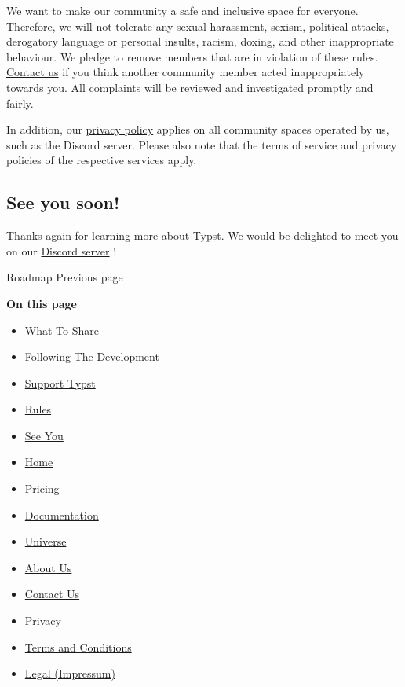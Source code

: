 We want to make our community a safe and inclusive space for everyone.
Therefore, we will not tolerate any sexual harassment, sexism, political
attacks, derogatory language or personal insults, racism, doxing, and
other inappropriate behaviour. We pledge to remove members that are in
violation of these rules. \href{https://typst.app/contact/}{Contact us}
if you think another community member acted inappropriately towards you.
All complaints will be reviewed and investigated promptly and fairly.

In addition, our \href{https://typst.app/privacy/}{privacy policy}
applies on all community spaces operated by us, such as the Discord
server. Please also note that the terms of service and privacy policies
of the respective services apply.

\subsection{See you soon!}\label{see-you}

Thanks again for learning more about Typst. We would be delighted to
meet you on our \href{https://discord.gg/2uDybryKPe}{Discord server} !

\href{/docs/roadmap/}{\pandocbounded{}}

{ Roadmap } { Previous page }

\textbf{On this page}

\begin{itemize}
\tightlist
\item
  \hyperref[what-to-share]{What To Share}
\item
  \hyperref[following-the-development]{Following The Development}
\item
  \hyperref[support-typst]{Support Typst}
\item
  \hyperref[rules]{Rules}
\item
  \hyperref[see-you]{See You}
\end{itemize}

\begin{itemize}
\tightlist
\item
  \href{/}{Home}
\item
  \href{/pricing/}{Pricing}
\item
  \href{/docs/}{Documentation}
\item
  \href{/universe/}{Universe}
\item
  \href{/about/}{About Us}
\item
  \href{/contact/}{Contact Us}
\item
  \href{/privacy/}{Privacy}
\item
  \href{https://typst.app/terms}{Terms and Conditions}
\item
  \href{/legal/}{Legal (Impressum)}
\end{itemize}

